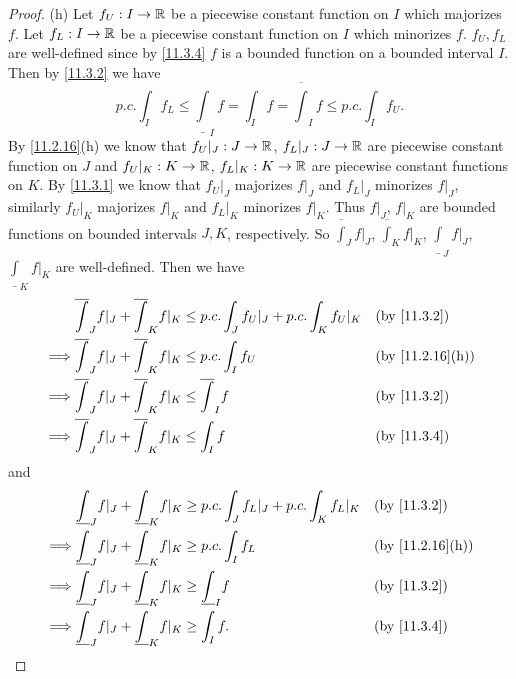 \begin{proof}{(h)}
  Let \(f_U : I \to \mathbb{R}\) be a piecewise constant function on \(I\) which majorizes \(f\).
  Let \(f_L : I \to \mathbb{R}\) be a piecewise constant function on \(I\) which minorizes \(f\).
  \(f_U, f_L\) are well-defined since by \cref{11.3.4} \(f\) is a bounded function on a bounded interval \(I\).
  Then by \cref{11.3.2} we have
  \[
    p.c. \int_I f_L \leq \underline{\int}_I f = \int_I f = \overline{\int}_I f \leq p.c. \int_I f_U.
  \]
  By \cref{11.2.16}(h) we know that \(f_U|_J : J \to \mathbb{R}\), \(f_L|_J : J \to \mathbb{R}\) are piecewise constant function on \(J\) and \(f_U|_K : K \to \mathbb{R}\), \(f_L|_K : K \to \mathbb{R}\) are piecewise constant functions on \(K\).
  By \cref{11.3.1} we know that \(f_U|_J\) majorizes \(f|_J\) and \(f_L|_J\) minorizes \(f|_J\), similarly \(f_U|_K\) majorizes \(f|_K\) and \(f_L|_K\) minorizes \(f|_K\).
  Thus \(f|_J\), \(f|_K\) are bounded functions on bounded intervals \(J, K\), respectively.
  So \(\overline{\int}_J f|_J\), \(\overline{\int}_K f|_K\), \(\underline{\int}_J f|_J\), \(\underline{\int}_K f|_K\) are well-defined.
  Then we have
  \begin{align*}
             & \overline{\int}_J f|_J + \overline{\int}_K f|_K \leq p.c. \int_J f_U|_J + p.c. \int_K f_U|_K &  & \text{(by \cref{11.3.2})}     \\
    \implies & \overline{\int}_J f|_J + \overline{\int}_K f|_K \leq p.c. \int_I f_U                         &  & \text{(by \cref{11.2.16}(h))} \\
    \implies & \overline{\int}_J f|_J + \overline{\int}_K f|_K \leq \overline{\int}_I f                     &  & \text{(by \cref{11.3.2})}     \\
    \implies & \overline{\int}_J f|_J + \overline{\int}_K f|_K \leq \int_I f                                &  & \text{(by \cref{11.3.4})}
  \end{align*}
  and
  \begin{align*}
             & \underline{\int}_J f|_J + \underline{\int}_K f|_K \geq p.c. \int_J f_L|_J + p.c. \int_K f_L|_K &  & \text{(by \cref{11.3.2})}     \\
    \implies & \underline{\int}_J f|_J + \underline{\int}_K f|_K \geq p.c. \int_I f_L                         &  & \text{(by \cref{11.2.16}(h))} \\
    \implies & \underline{\int}_J f|_J + \underline{\int}_K f|_K \geq \underline{\int}_I f                    &  & \text{(by \cref{11.3.2})}     \\
    \implies & \underline{\int}_J f|_J + \underline{\int}_K f|_K \geq \int_I f.                               &  & \text{(by \cref{11.3.4})}

\end{align*}
\end{proof}
